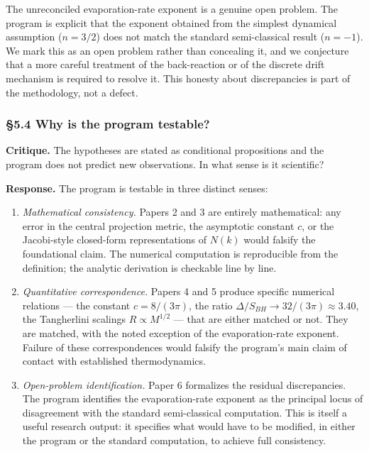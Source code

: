 \documentclass[a4paper,11pt]{article}
\theoremstyle{definition}
\begin{document}
The unreconciled evaporation-rate exponent is a genuine open problem.
The program is explicit that the exponent obtained from the simplest
dynamical assumption (\(n = 3/2\)) does not match the standard
semi-classical result (\(n = -1\)). We mark this as an open problem
rather than concealing it, and we conjecture that a more careful
treatment of the back-reaction or of the discrete drift mechanism is
required to resolve it. This honesty about discrepancies is part of the
methodology, not a defect.

\subsubsection{§5.4 Why is the program
testable?}\label{why-is-the-program-testable}

\textbf{Critique.} The hypotheses are stated as conditional propositions
and the program does not predict new observations. In what sense is it
scientific?

\textbf{Response.} The program is testable in three distinct senses:

\begin{enumerate}
\def\labelenumi{\arabic{enumi}.}
\item
  \emph{Mathematical consistency.} Papers 2 and 3 are entirely
  mathematical: any error in the central projection metric, the
  asymptotic constant \(c\), or the Jacobi-style closed-form
  representations of \(N(k)\) would falsify the foundational claim. The
  numerical computation is reproducible from the definition; the
  analytic derivation is checkable line by line.
\item
  \emph{Quantitative correspondence.} Papers 4 and 5 produce specific
  numerical relations --- the constant \(c = 8/(3\pi)\), the ratio
  \(\Delta/S_{BH} \to 32/(3\pi) \approx 3.40\), the Tangherlini scalings
  \(R \propto M^{1/2}\) --- that are either matched or not. They are
  matched, with the noted exception of the evaporation-rate exponent.
  Failure of these correspondences would falsify the program's main
  claim of contact with established thermodynamics.
\item
  \emph{Open-problem identification.} Paper 6 formalizes the residual
  discrepancies. The program identifies the evaporation-rate exponent as
  the principal locus of disagreement with the standard semi-classical
  computation. This is itself a useful research output: it specifies
  what would have to be modified, in either the program or the standard
  computation, to achieve full consistency.
\end{enumerate}
\end{document}
